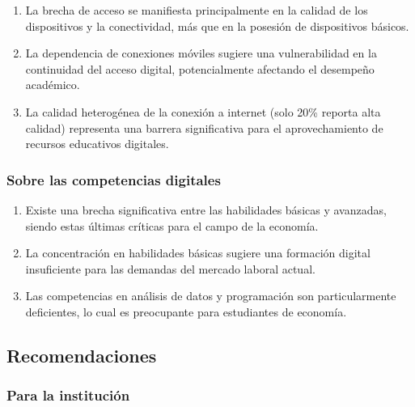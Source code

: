 \documentclass[12pt, a4paper]{article}
\begin{document}
\begin{enumerate}
    \item La brecha de acceso se manifiesta principalmente en la calidad de los dispositivos y la conectividad, más que en la posesión de dispositivos básicos.
    
    \item La dependencia de conexiones móviles sugiere una vulnerabilidad en la continuidad del acceso digital, potencialmente afectando el desempeño académico.
    
    \item La calidad heterogénea de la conexión a internet (solo 20\% reporta alta calidad) representa una barrera significativa para el aprovechamiento de recursos educativos digitales.
\end{enumerate}

\subsubsection{Sobre las competencias digitales}

\begin{enumerate}
    \item Existe una brecha significativa entre las habilidades básicas y avanzadas, siendo estas últimas críticas para el campo de la economía.
    
    \item La concentración en habilidades básicas sugiere una formación digital insuficiente para las demandas del mercado laboral actual.
    
    \item Las competencias en análisis de datos y programación son particularmente deficientes, lo cual es preocupante para estudiantes de economía.
\end{enumerate}

\subsection{Recomendaciones}

\subsubsection{Para la institución}
\end{document}
